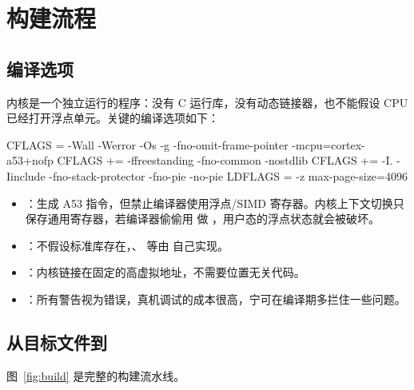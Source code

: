 \section{构建流程}

\subsection{编译选项}

内核是一个独立运行的程序：没有 C 运行库，没有动态链接器，也不能假设 CPU 已经打开浮点单元。关键的编译选项如下：

\begin{makecode}
CFLAGS = -Wall -Werror -Os -g -fno-omit-frame-pointer -mcpu=cortex-a53+nofp
CFLAGS += -ffreestanding -fno-common -nostdlib
CFLAGS += -I. -Iinclude -fno-stack-protector -fno-pie -no-pie
LDFLAGS = -z max-page-size=4096
\end{makecode}

\begin{itemize}
  \item {}：生成 A53 指令，但禁止编译器使用浮点/SIMD 寄存器。内核上下文切换只保存通用寄存器，若编译器偷偷用  做 ，用户态的浮点状态就会被破坏。
  \item {}：不假设标准库存在，、 等由  自己实现。
  \item {}：内核链接在固定的高虚拟地址，不需要位置无关代码。
  \item {}：所有警告视为错误，真机调试的成本很高，宁可在编译期多拦住一些问题。
\end{itemize}

\subsection{从目标文件到 }

图~\ref{fig:build} 是完整的构建流水线。

